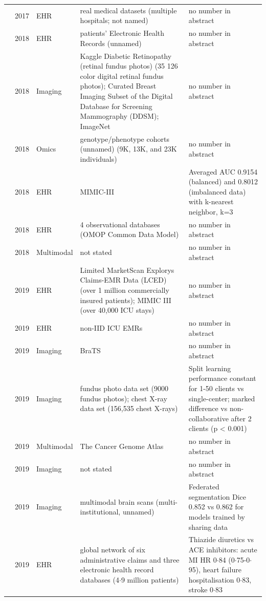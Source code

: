\begin{longtable}{@{}p{2.6cm}p{0.7cm}p{1.2cm}p{4.4cm}p{4.6cm}@{}}
\cite{kim2017federated} & 2017 & EHR & real medical datasets (multiple hospitals; not named) & no number in abstract\\
\cite{brisimi2018federated} & 2018 & EHR & patients' Electronic Health Records (unnamed) & no number in abstract\\
\cite{chang2018distributed} & 2018 & Imaging & Kaggle Diabetic Retinopathy (retinal fundus photos) (35 126 color digital retinal fundus photos); Curated Breast Imaging Subset of the Digital Database for Screening Mammography (DDSM); ImageNet & no number in abstract\\
\cite{cho2018secure} & 2018 & Omics & genotype/phenotype cohorts (unnamed) (9K, 13K, and 23K individuals) & no number in abstract\\
\cite{lee2018privacy} & 2018 & EHR & MIMIC-III & Averaged AUC 0.9154 (balanced) and 0.8012 (imbalanced data) with k-nearest neighbor, k=3\\
\cite{reps2018design} & 2018 & EHR & 4 observational databases (OMOP Common Data Model) & no number in abstract\\
\cite{vepakomma2018split} & 2018 & Multimodal & not stated & no number in abstract\\
\cite{choudhury2019differential} & 2019 & EHR & Limited MarketScan Explorys Claims-EMR Data (LCED) (over 1 million commercially insured patients); MIMIC III (over 40,000 ICU stays) & no number in abstract\\
\cite{huang2019patient} & 2019 & EHR & non-IID ICU EMRs & no number in abstract\\
\cite{li2019privacy} & 2019 & Imaging & BraTS & no number in abstract\\
\cite{poirot2019split} & 2019 & Imaging & fundus photo data set (9000 fundus photos); chest X-ray data set (156,535 chest X-rays) & Split learning performance constant for 1-50 clients vs single-center; marked difference vs non-collaborative after 2 clients (p < 0.001)\\
\cite{raisaro2019medco} & 2019 & Multimodal & The Cancer Genome Atlas & no number in abstract\\
\cite{roy2019braintorrent} & 2019 & Imaging & not stated & no number in abstract\\
\cite{sheller2019multi} & 2019 & Imaging & multimodal brain scans (multi-institutional, unnamed) & Federated segmentation Dice 0.852 vs 0.862 for models trained by sharing data\\
\cite{suchard2019comprehensive} & 2019 & EHR & global network of six administrative claims and three electronic health record databases (4$\cdot$9 million patients) & Thiazide diuretics vs ACE inhibitors: acute MI HR 0$\cdot$84 (0$\cdot$75-0$\cdot$95), heart failure hospitalisation 0$\cdot$83, stroke 0$\cdot$83\\

\end{longtable}
